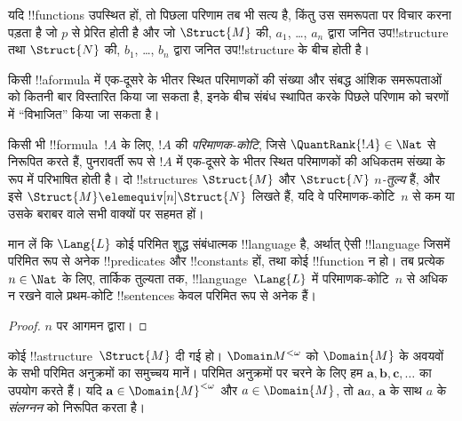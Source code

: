 \documentclass[../../../include/open-logic-section]{subfiles}
\begin{document}
\begin{rem}
यदि !!{function}s उपस्थित हों, तो पिछला परिणाम तब भी सत्य है, किंतु उस
समरूपता पर विचार करना पड़ता है जो $p$ से प्रेरित होती है और जो $\Struct{M}$
की, $a_1$, \dots, $a_n$ द्वारा जनित उप!!{structure} तथा $\Struct{N}$ की,
$b_1$, \dots, $b_n$ द्वारा जनित उप!!{structure} के बीच होती है।
\end{rem}

किसी !!a{formula} में एक-दूसरे के भीतर स्थित परिमाणकों की संख्या और संबद्ध आंशिक
समरूपताओं को कितनी बार विस्तारित किया जा सकता है, इनके बीच संबंध स्थापित करके
पिछले परिणाम को चरणों में ``विभाजित'' किया जा सकता है।

\begin{defn}
  किसी भी !!{formula}~$!A$ के लिए, $!A$ की \emph{परिमाणक-कोटि}, जिसे
  $\QuantRank{!A} \in \Nat$ से निरूपित करते हैं, पुनरावर्ती रूप से $!A$ में
  एक-दूसरे के भीतर स्थित परिमाणकों की अधिकतम संख्या के रूप में परिभाषित होती है। दो
  !!{structure}s $\Struct{M}$ और $\Struct{N}$ \emph{$n$-तुल्य} हैं, और इसे
  $\Struct{M} \elemequiv[n] \Struct{N}$ लिखते हैं, यदि वे परिमाणक-कोटि~$n$
  से कम या उसके बराबर वाले सभी वाक्यों पर सहमत हों।
\end{defn}

\begin{prop}
  मान लें कि $\Lang{L}$ कोई परिमित शुद्ध संबंधात्मक !!{language} है, अर्थात्
  ऐसी !!{language} जिसमें परिमित रूप से अनेक !!{predicate}s और
  !!{constant}s हों, तथा कोई !!{function} न हो। तब प्रत्येक $n \in \Nat$
  के लिए, तार्किक तुल्यता तक, !!{language}~$\Lang{L}$ में परिमाणक-कोटि~$n$
  से अधिक न रखने वाले प्रथम-कोटि !!{sentence}s केवल परिमित रूप से अनेक हैं।
\end{prop}

\begin{proof}
  $n$ पर आगमन द्वारा।
\end{proof}

\begin{defn}
  कोई !!a{structure}~$\Struct{M}$ दी गई हो। $\Domain M^{<\omega}$ को
  $\Domain{M}$ के अवयवों के सभी परिमित अनुक्रमों का समुच्चय मानें। परिमित
  अनुक्रमों पर चरने के लिए हम $\mathbf{a},
  \mathbf{b}, \mathbf{c}, \ldots$
  का उपयोग करते हैं। यदि $\mathbf{a} \in \Domain{M}^{<\omega}$ और
  $a \in \Domain{M}$, तो $\mathbf{a}a$, $\mathbf{a}$ के साथ $a$ के
  \emph{संलग्नन} को निरूपित करता है।
\end{defn}
\end{document}
